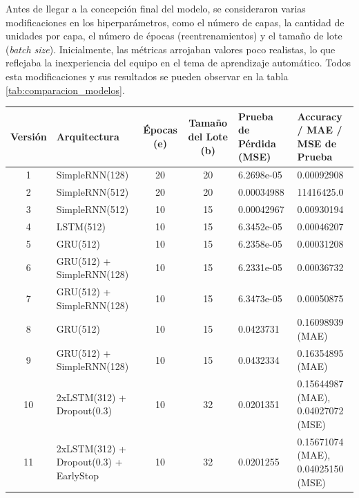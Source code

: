 \documentclass[runningheads]{llncs}
\begin{document}
Antes de llegar a la concepción final del modelo, se consideraron varias modificaciones en los hiperparámetros, como el número de capas, la cantidad de unidades por capa, el número de épocas (reentrenamientos) y el tamaño de lote (\textit{batch size}). Inicialmente, las métricas arrojaban valores poco realistas, lo que reflejaba la inexperiencia del equipo en el tema de aprendizaje automático. Todos esta modificaciones y sus resultados se pueden observar en la tabla \ref{tab:comparacion_modelos}.


\begin{table}[h!]
	\centering
	\begin{tabular}{|c|p{2.5cm}|c|c|p{1.8cm}|p{2.8cm}|}
		\hline
		\textbf{Versión} & \textbf{Arquitectura} & \textbf{Épocas (e)} & \textbf{Tamaño del Lote (b)} & \textbf{Prueba de Pérdida \newline (MSE)} & \textbf{ Accuracy / \newline MAE / MSE de Prueba} \\ \hline
		1 & SimpleRNN(128) & 20 & 20 & 6.2698e-05 & 0.00092908 \\ \hline
		2 & SimpleRNN(512) & 20 & 20 & 0.00034988 & 11416425.0 \\ \hline
		3 & SimpleRNN(512) & 10 & 15 & 0.00042967 & 0.00930194 \\ \hline
		4 & LSTM(512) & 10 & 15 & 6.3452e-05 & 0.00046207 \\ \hline
		5 & GRU(512) & 10 & 15 & 6.2358e-05 & 0.00031208 \\ \hline
		6 & GRU(512) + \newline SimpleRNN(128) & 10 & 15 & 6.2331e-05 & 0.00036732 \\ \hline
		7 & GRU(512) + \newline SimpleRNN(128) & 10 & 15 & 6.3473e-05 & 0.00050875 \\ \hline
		8 & GRU(512) & 10 & 15 & 0.0423731 & 0.16098939 (MAE) \\ \hline
		9 & GRU(512) + \newline SimpleRNN(128) & 10 & 15 & 0.0432334 & 0.16354895 (MAE) \\ \hline
		10 & 2xLSTM(312) + \newline Dropout(0.3) & 10 & 32 & 0.0201351 & 0.15644987 (MAE), 0.04027072 (MSE) \\ \hline
		11 & 2xLSTM(312) + \newline Dropout(0.3) + \newline EarlyStop & 10 & 32 & 0.0201255 & 0.15671074 (MAE), 0.04025150 (MSE) \\ \hline

\end{tabular}
\end{table}
\end{document}

